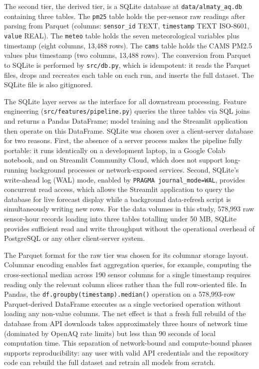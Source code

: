 The second tier, the derived tier, is a SQLite database at \texttt{data/almaty\_aq.db} containing three tables. The \texttt{pm25} table holds the per-sensor raw readings after parsing from Parquet (columns: \texttt{sensor\_id} TEXT, \texttt{timestamp} TEXT ISO-8601, \texttt{value} REAL). The \texttt{meteo} table holds the seven meteorological variables plus timestamp (eight columns, 13,488 rows). The \texttt{cams} table holds the CAMS PM2.5 values plus timestamp (two columns, 13,488 rows). The conversion from Parquet to SQLite is performed by \texttt{src/db.py}, which is idempotent: it reads the Parquet files, drops and recreates each table on each run, and inserts the full dataset. The SQLite file is also gitignored.

The SQLite layer serves as the interface for all downstream processing. Feature engineering (\texttt{src/features/pipeline.py}) queries the three tables via SQL joins and returns a Pandas DataFrame; model training and the Streamlit application then operate on this DataFrame. SQLite was chosen over a client-server database for two reasons. First, the absence of a server process makes the pipeline fully portable: it runs identically on a development laptop, in a Google Colab notebook, and on Streamlit Community Cloud, which does not support long-running background processes or network-exposed services. Second, SQLite's write-ahead log (WAL) mode, enabled by \texttt{PRAGMA\ journal\_mode=WAL}, provides concurrent read access, which allows the Streamlit application to query the database for live forecast display while a background data-refresh script is simultaneously writing new rows. For the data volumes in this study, 578,993 raw sensor-hour records loading into three tables totalling under 50 MB, SQLite provides sufficient read and write throughput without the operational overhead of PostgreSQL or any other client-server system.

The Parquet format for the raw tier was chosen for its columnar storage layout. Columnar encoding enables fast aggregation queries, for example, computing the cross-sectional median across 190 sensor columns for a single timestamp requires reading only the relevant column slices rather than the full row-oriented file. In Pandas, the \texttt{df.groupby(\textquotesingle{}timestamp\textquotesingle{}).median()} operation on a 578,993-row Parquet-derived DataFrame executes as a single vectorised operation without loading any non-value columns. The net effect is that a fresh full rebuild of the database from API downloads takes approximately three hours of network time (dominated by OpenAQ rate limits) but less than 90 seconds of local computation time. This separation of network-bound and compute-bound phases supports reproducibility: any user with valid API credentials and the repository code can rebuild the full dataset and retrain all models from scratch.


